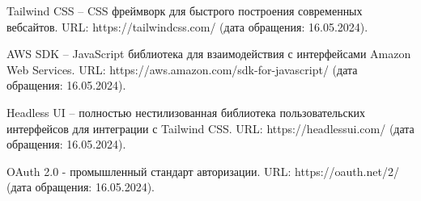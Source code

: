 \documentclass{mirea}
\begin{document}
\begin{thebibliography}{99\kern\bibindent}
	 Tailwind CSS – CSS фреймворк для быстрого построения современных вебсайтов. URL: https://tailwindcss.com/ (дата обращения: 16.05.2024).
	
	 AWS SDK – JavaScript библиотека для взаимодействия с интерфейсами Amazon Web Services. URL: https://aws.amazon.com/sdk-for-javascript/ (дата обращения: 16.05.2024).
	
	 Headless UI – полностью нестилизованная библиотека пользовательских интерфейсов для интеграции с Tailwind CSS. URL: https://headlessui.com/ (дата обращения: 16.05.2024).
	
	 OAuth 2.0 - промышленный стандарт авторизации. URL: https://oauth.net/2/ (дата обращения: 16.05.2024).
\end{thebibliography}




%

	
\end{document}
